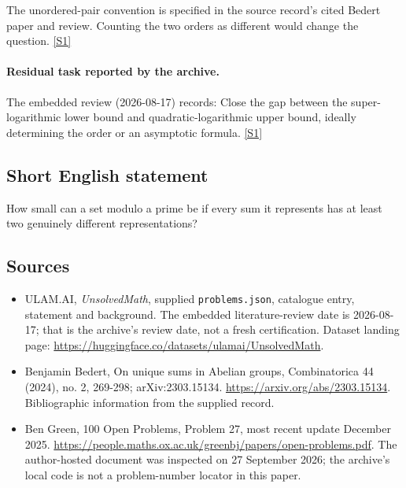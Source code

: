 \documentclass[11pt,a4paper]{article}
\newcommand{\sref}[2]{\hyperlink{source:#1:#2}{[S#2]}}
\begin{document}
The unordered-pair convention is specified in the source record’s cited Bedert paper and review. Counting the two orders as different would change the question. \sref{statement}{1}

\paragraph{Residual task reported by the archive.}

The embedded review (2026-08-17) records: Close the gap between the super-logarithmic lower bound and quadratic-logarithmic upper bound, ideally determining the order or an asymptotic formula. \sref{statement}{1}

\subsection{Short English statement}

How small can a set modulo a prime be if every sum it represents has at least two genuinely different representations?

\subsection{Sources}

{\small

\begin{itemize}

\item[\hypertarget{source:statement:1}{S1}] ULAM.AI, \emph{UnsolvedMath}, supplied \texttt{problems.json}, catalogue entry, statement and background. The embedded literature-review date is 2026-08-17; that is the archive’s review date, not a fresh certification. Dataset landing page: \url{https://huggingface.co/datasets/ulamai/UnsolvedMath}.

\item[\hypertarget{source:statement:2}{S2}] Benjamin Bedert, On unique sums in Abelian groups, Combinatorica 44 (2024), no. 2, 269-298; arXiv:2303.15134. \url{https://arxiv.org/abs/2303.15134}. Bibliographic information from the supplied record.

\item[\hypertarget{source:statement:3}{S3}] Ben Green, 100 Open Problems, Problem 27, most recent update December 2025. \url{https://people.maths.ox.ac.uk/greenbj/papers/open-problems.pdf}. The author-hosted document was inspected on 27 September 2026; the archive’s local code is not a problem-number locator in this paper.

\end{itemize}

}

\label{end:statement}
\end{document}
